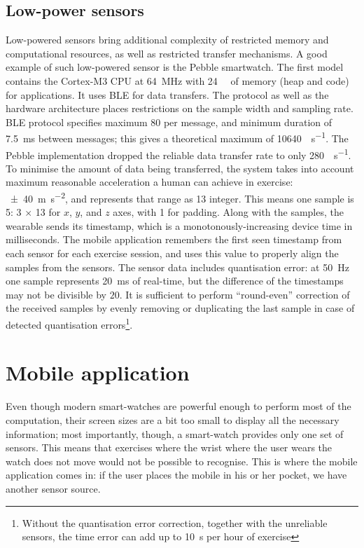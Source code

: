 \subsection{Low-power sensors}
Low-powered sensors bring additional complexity of restricted memory and computational resources, as well as restricted transfer mechanisms. A good example of such low-powered sensor is the Pebble smartwatch. The first model contains the Cortex-M3 CPU at \SI{64}{\mega\hertz} with \SI{24}{\kibi\byte} of memory (heap and code) for applications. It uses BLE for data transfers. The protocol as well as the hardware architecture places restrictions on the sample width and sampling rate. BLE protocol specifies maximum \SI{80}{\byte} per message, and minimum duration of \SI{7.5}{\milli\second} between messages; this gives a theoretical maximum of \SI{10640}{\byte\per\second}. The Pebble implementation dropped the reliable data transfer rate to only \SI{280}{\byte\per\second}. To minimise the amount of data being transferred, the system takes into account maximum reasonable acceleration a human can achieve in exercise: \SI{\pm40}{\meter\second^{-2}}, and represents that range as \SI{13}{\bit} integer. This means one sample is \SI{5}{\byte}: 3 $\times$ \SI{13}{\bit} for $x$, $y$, and $z$ axes, with \SI{1}{\bit} for padding. Along with the samples, the wearable sends its timestamp, which is a monotonously-increasing device time in milliseconds. The mobile application remembers the first seen timestamp from each sensor for each exercise session, and uses this value to properly align the samples from the sensors. The sensor data includes quantisation error: at \SI{50}{\hertz} one sample represents \SI{20}{\milli\second} of real-time, but the difference of the timestamps may not be divisible by $20$. It is sufficient to perform ``round-even'' correction of the received samples by evenly removing or duplicating the last sample in case of detected quantisation errors\footnote{Without the quantisation error correction, together with the unreliable sensors, the time error can add up to \SI{10}{\second} per hour of exercise}. 

\section{Mobile application}
Even though modern smart-watches are powerful enough to perform most of the computation, their screen sizes are a bit too small to display all the necessary information; most importantly, though, a smart-watch provides only one set of sensors. This means that exercises where the wrist where the user wears the watch does not move would not be possible to recognise. This is where the mobile application comes in: if the user places the mobile in his or her pocket, we have another sensor source. 

